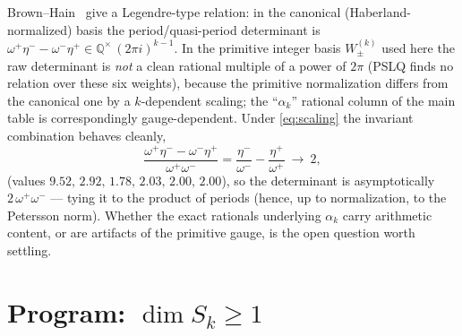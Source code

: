 \documentclass[11pt]{article}
\newcommand{\QQ}{\mathbb{Q}}
\begin{document}
Brown--Hain~\cite{Brown2017} give a Legendre-type relation: in the canonical
(Haberland-normalized) basis the period/quasi-period determinant is
$\omega^+\eta^--\omega^-\eta^+\in\QQ^\times\,(2\pi i)^{k-1}$. In the primitive integer
basis $W_\pm^{(k)}$ used here the raw determinant is \emph{not} a clean rational multiple
of a power of $2\pi$ (PSLQ finds no relation over these six weights), because the primitive
normalization differs from the canonical one by a $k$-dependent scaling; the ``$\alpha_k$''
rational column of the main table is correspondingly gauge-dependent. Under \eqref{eq:scaling}
the invariant combination behaves cleanly,
\begin{equation}\label{eq:invariant}
\frac{\omega^+\eta^--\omega^-\eta^+}{\omega^+\omega^-}
=\frac{\eta^-}{\omega^-}-\frac{\eta^+}{\omega^+}\ \longrightarrow\ 2,
\end{equation}
(values $9.52,\,2.92,\,1.78,\,2.03,\,2.00,\,2.00$), so the determinant is asymptotically
$2\,\omega^+\omega^-$ --- tying it to the product of periods (hence, up to normalization, to
the Petersson norm). Whether the exact rationals underlying $\alpha_k$ carry arithmetic
content, or are artifacts of the primitive gauge, is the open question worth settling.

\section{Program: $\dim S_k\ge1$}\label{sec:program}
\end{document}
